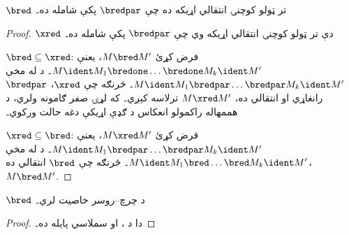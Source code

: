 \documentclass[../../../include/open-logic-section]{subfiles}
\begin{document}
\begin{lem}
  $\bred$ تر ټولو کوچنۍ انتقالي اړيکه ده چې $\bredpar$ پکې
  شامله ده۔
\end{lem}

\begin{proof}
  $\xred$ دې تر ټولو کوچنۍ انتقالي اړيکه وي چې
  $\bredpar$ پکې شامله ده۔

  $\bred \subseteq \xred$: فرض کړئ $M \bred M'$، يعنې
  $M \ident M_1 \bredone \dots \bredone M_k \ident M'$۔
  د  له مخې $M
  \ident M_1 \bredpar \dots \bredpar M_k \ident M'$۔
  څرنګه چې $\xred$، $\bredpar$ رانغاړي او انتقالي ده،
  $M \xred M'$ ترلاسه کېږي۔ که لړۍ صفر ګامونه ولري، د هممهاله راکمولو انعکاس د ګډې اړيکې دغه حالت ورکوي۔

  $\xred \subseteq \bred$: فرض کړئ $M \xred M'$، يعنې $M
  \ident M_1 \bredpar \dots \bredpar M_k \ident M'$۔ د 
  له مخې $M \ident M_1 \bred \dots \bred M_k \ident M'$۔
  څرنګه چې $\bred$ انتقالي ده، $M \bred M'$.
\end{proof}

\begin{thm}
  $\bred$ د چرچ--روسر خاصيت لري۔
\end{thm}

\begin{proof}
  دا د ،  او
   سملاسي پايله ده۔
\end{proof}
\end{document}
